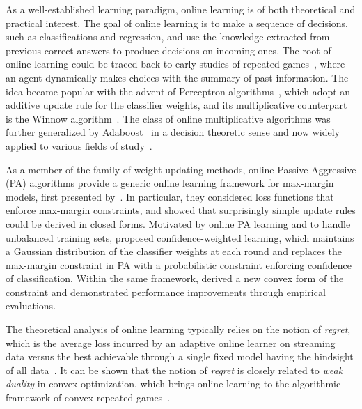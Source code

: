 \documentclass[twoside,11pt]{article}
\begin{document}
As a well-established learning paradigm, online learning is of both theoretical and practical interest. The goal of online learning is to make a sequence of decisions, such as classifications and regression, and use the knowledge extracted from previous correct answers to produce decisions on incoming ones. The root of online learning could be traced back to early studies of repeated games~\citep{hannan1957approximation}, where an agent dynamically makes choices with the summary of past information. The idea became popular with the advent of Perceptron algorithms~\citep{rosenblatt1958perceptron}, which adopt an additive update rule for the classifier weights, and its multiplicative counterpart is the Winnow algorithm~\citep{littlestone1988learning}. The class of online multiplicative algorithms was further generalized by Adaboost~\citep{freund1997decision} in a decision theoretic sense and now widely applied to various fields of study~\citep{arora2012multiplicative}.

As a member of the family of weight updating methods, online Passive-Aggressive (PA) algorithms provide a generic online learning framework for max-margin models, first presented by~\citet{crammer2006pa}. In particular, they considered loss functions that enforce max-margin constraints, and showed that surprisingly simple update rules could be derived in closed forms. Motivated by online PA learning and to handle unbalanced training sets, \cite{dredze2008confidence} proposed confidence-weighted learning, which maintains a Gaussian distribution of the classifier weights at each round and replaces the max-margin constraint in PA with a probabilistic constraint enforcing confidence of classification. Within the same framework, \cite{pereira2008exact} derived a new convex form of the constraint and demonstrated performance improvements through empirical evaluations.

The theoretical analysis of online learning typically relies on the notion of \emph{regret}, which is the average loss incurred by an adaptive online learner on streaming data versus the best achievable through a single fixed model having the hindsight of all data~\citep{murphy2012machine_reget}. It can be shown that the notion of \emph{regret} is closely related to \emph{weak duality} in convex optimization, which brings online learning to the algorithmic framework of convex repeated games~\citep{shalev2006convex}.
\end{document}
